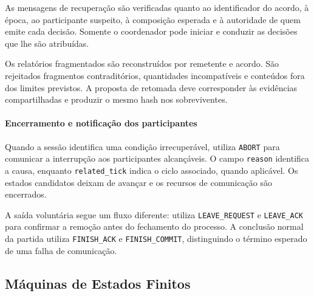 \documentclass[11pt,a4paper]{article}
\begin{document}
As mensagens de recuperação são verificadas quanto ao identificador do acordo, à época, ao participante suspeito, à composição esperada e à autoridade de quem emite cada decisão. Somente o coordenador pode iniciar e conduzir as decisões que lhe são atribuídas.

Os relatórios fragmentados são reconstruídos por remetente e acordo. São rejeitados fragmentos contraditórios, quantidades incompatíveis e conteúdos fora dos limites previstos. A proposta de retomada deve corresponder às evidências compartilhadas e produzir o mesmo hash nos sobreviventes.

\paragraph{Encerramento e notificação dos participantes}

Quando a sessão identifica uma condição irrecuperável, utiliza \texttt{ABORT} para comunicar a interrupção aos participantes alcançáveis. O campo \texttt{reason} identifica a causa, enquanto \texttt{related\_tick} indica o ciclo associado, quando aplicável. Os estados candidatos deixam de avançar e os recursos de comunicação são encerrados.

A saída voluntária segue um fluxo diferente: utiliza \texttt{LEAVE\_REQUEST} e \texttt{LEAVE\_ACK} para confirmar a remoção antes do fechamento do processo. A conclusão normal da partida utiliza \texttt{FINISH\_ACK} e \texttt{FINISH\_COMMIT}, distinguindo o término esperado de uma falha de comunicação.


\subsection{Máquinas de Estados Finitos}
\label{sec:fsm}
\end{document}
